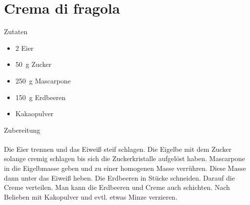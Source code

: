 \section*{Crema di fragola}
\ihead{}\ohead{}
\cfoot{}
{\Large Zutaten}
\begin{multicols}{2}
\begin{itemize}
    \item \num{2} Eier
    \item \SI{50}{g} Zucker
    \item \SI{250}{g} Mascarpone
    \item \SI{150}{g} Erdbeeren
    \item Kakaopulver
\end{itemize}
\end{multicols}
\noindent
{\Large Zubereitung}\\
\\
Die Eier trennen und das Eiweiß steif schlagen. 
Die Eigelbe mit dem Zucker solange cremig schlagen bis sich die Zuckerkristalle aufgelöst haben. 
Mascarpone in die Eigelbmasse geben und zu einer homogenen Masse verrühren. 
Diese Masse dann unter das Eiweiß heben. 
Die Erdbeeren in Stücke schneiden. 
Darauf die Creme verteilen. 
Man kann die Erdbeeren und Creme auch schichten. 
Nach Belieben mit Kakopulver und evtl. etwas Minze verzieren. 